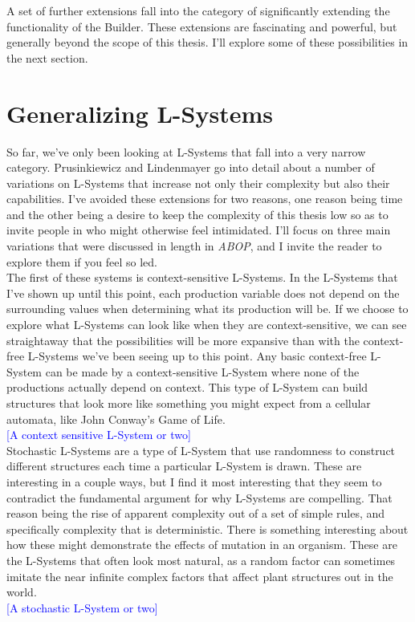 \documentclass[12pt,twoside]{reedthesis}
\begin{document}
	A set of further extensions fall into the category of significantly extending the functionality of the Builder. These extensions are fascinating and powerful, but generally beyond the scope of this thesis. I'll explore some of these possibilities in the next section.\\

\section{Generalizing L-Systems}
So far, we've only been looking at L-Systems that fall into a very narrow category. Prusinkiewicz and Lindenmayer go into detail about a number of variations on L-Systems that increase not only their complexity but also their capabilities. I've avoided these extensions for two reasons, one reason being time and the other being a desire to keep the complexity of this thesis low so as to invite people in who might otherwise feel intimidated. I'll focus on three main variations that were discussed in length in \textit{ABOP}, and I invite the reader to explore them if you feel so led.\\

	The first of these systems is context-sensitive L-Systems. In the L-Systems that I've shown up until this point, each production variable does not depend on the surrounding values when determining what its production will be. If we choose to explore what L-Systems can look like when they are context-sensitive, we can see straightaway that the possibilities will be more expansive than with the context-free L-Systems we've been seeing up to this point. Any basic context-free L-System can be made by a context-sensitive L-System where none of the productions actually depend on context. This type of L-System can build structures that look more like something you might expect from a cellular automata, like John Conway's Game of Life.\\
	\textcolor{blue}{[A context sensitive L-System or two]}\\
	
	Stochastic L-Systems are a type of L-System that use randomness to construct different structures each time a particular L-System is drawn. These are interesting in a couple ways, but I find it most interesting that they seem to contradict the fundamental argument for why L-Systems are compelling. That reason being the rise of apparent complexity out of a set of simple rules, and specifically complexity that is deterministic. There is something interesting about how these might demonstrate the effects of mutation in an organism. These are the L-Systems that often look most natural, as a random factor can sometimes imitate the near infinite complex factors that affect plant structures out in the world.\\
	\textcolor{blue}{[A stochastic L-System or two]}\\
	
\end{document}

